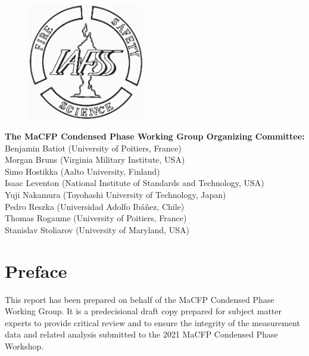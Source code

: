 \documentclass{book}
\begin{document}
\begin{minipage}{0.25\textwidth}
\begin{figure}[H]
\includegraphics[width=2in]{FIGURES/IAFSSLogo}
\end{figure}
\end{minipage} \hfill
\begin{minipage}{0.7\textwidth}
\begin{flushright}
{\bf The MaCFP Condensed Phase Working Group Organizing Committee:} \\
Benjamin Batiot (University of Poitiers, France) \\
Morgan Bruns (Virginia Military Institute, USA) \\
Simo Hostikka (Aalto University, Finland) \\
Isaac Leventon (National Institute of Standards and Technology, USA) \\
Yuji Nakamura (Toyohashi University of Technology, Japan) \\
Pedro Reszka (Universidad Adolfo Ibáñez, Chile) \\
Thomas Rogaume (University of Poitiers, France) \\
Stanislav Stoliarov (University of Maryland, USA)
\end{flushright}
\end{minipage}


\newpage
\thispagestyle{empty}

\frontmatter

\chapter{Preface}
\thispagestyle{fancy}
This report has been prepared on behalf of the MaCFP Condensed Phase Working Group. It is a predecisional draft copy prepared for subject matter experts to provide critical review and to ensure the integrity of the measurement data and related analysis submitted to the 2021 MaCFP Condensed Phase Workshop.
\end{document}
